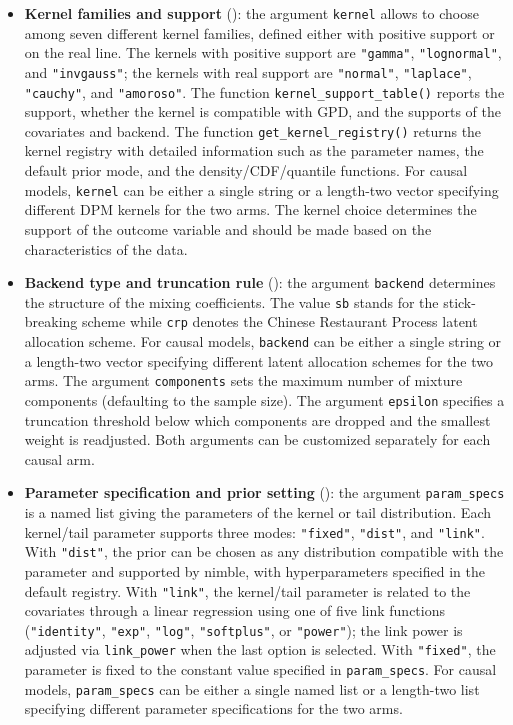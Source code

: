 \documentclass[article]{jss}\usepackage[]{graphicx}\usepackage[]{xcolor}
\DeclareRobustCommand{\pkg}[1]{\textsf{#1}}
\DeclareRobustCommand{\code}[1]{\nolinkurl{#1}}
\begin{document}
\begin{itemize}
\item \textbf{Kernel families and support} (\label{subsec:app-kernels}): the argument \code{kernel} allows to choose among seven different kernel families, defined either with positive support or on the real line. The kernels with positive support are \code{"gamma"}, \code{"lognormal"}, and \code{"invgauss"}; the kernels with real support are \code{"normal"}, \code{"laplace"}, \code{"cauchy"}, and \code{"amoroso"}. The function \code{kernel_support_table()} reports the support, whether the kernel is compatible with GPD, and the supports of the covariates and backend. The function \code{get_kernel_registry()} returns the kernel registry with detailed information such as the parameter names, the default prior mode, and the density/CDF/quantile functions. For causal models, \code{kernel} can be either a single string or a length-two vector specifying different DPM kernels for the two arms. The kernel choice determines the support of the outcome variable and should be made based on the characteristics of the data.

\item \textbf{Backend type and truncation rule} (\label{subsec:app-backends}): the argument \code{backend} determines the structure of the mixing coefficients. The value \code{sb} stands for the stick-breaking scheme while \code{crp} denotes the Chinese Restaurant Process latent allocation scheme. For causal models, \code{backend} can be either a single string or a length-two vector specifying different latent allocation schemes for the two arms. The argument \code{components} sets the maximum number of mixture components (defaulting to the sample size). The argument \code{epsilon} specifies a truncation threshold below which components are dropped and the smallest weight is readjusted. Both arguments can be customized separately for each causal arm.

\item \textbf{Parameter specification and prior setting} (\label{subsec:app-priors}): the argument \code{param_specs} is a named list giving the parameters of the kernel or tail distribution. Each kernel/tail parameter supports three modes: \code{"fixed"}, \code{"dist"}, and \code{"link"}. With \code{"dist"}, the prior can be chosen as any distribution compatible with the parameter and supported by \pkg{nimble}, with hyperparameters specified in the default registry. With \code{"link"}, the kernel/tail parameter is related to the covariates through a linear regression using one of five link functions (\code{"identity"}, \code{"exp"}, \code{"log"}, \code{"softplus"}, or \code{"power"}); the link power is adjusted via \code{link_power} when the last option is selected. With \code{"fixed"}, the parameter is fixed to the constant value specified in \code{param_specs}. For causal models, \code{param_specs} can be either a single named list or a length-two list specifying different parameter specifications for the two arms.
\end{itemize}
\end{document}
